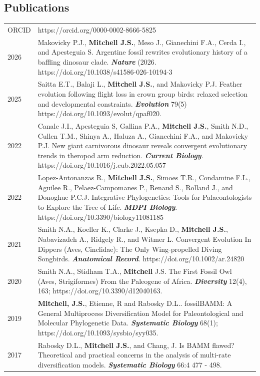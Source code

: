 \documentclass[a4paper, oneside, final]{scrartcl} %
\newcommand{\gray}{\rowcolor[gray]{.90}} %
\begin{document}
\begin{center}
\section{Publications}
\begin{tabularx}{0.97\linewidth}{>{\raggedleft\scshape}p{2cm}X}
 ORCID & https://orcid.org/0000-0002-8666-5825 \\
\gray 2026 & Makovicky P.J., \textbf{Mitchell J.S.}, Meso J., Gianechini F.A., Cerda I., and Apesteguia S. Argentine fossil rewrites evolutionary history of a baffling dinosaur clade. \textbf{\textit{Nature}} (2026. https://doi.org/10.1038/s41586-026-10194-3 \\
 2025 & Saitta E.T., Balaji L., \textbf{Mitchell J.S.}, and Makovicky P.J. Feather evolution following flight loss in crown group birds: relaxed selection and developmental constraints. \textbf{\textit{Evolution}} 79(5) https://doi.org/10.1093/evolut/qpaf020.\\
\gray 2022 & Canale J.I., Apesteguia S, Gallina P.A., \textbf{Mitchell J.S.}, Smith N.D., Cullen T.M., Shinya A., Haluza A., Gianechini F.A., and Makovicky P.J. New giant carnivorous dinosaur reveals convergent evolutionary trends in theropod arm reduction. \textbf{\textit{Current Biology}}. https://doi.org/10.1016/j.cub.2022.05.057 \\
2022 & Lopez-Antonanzas R., \textbf{Mitchell J.S.}, Simoes T.R., Condamine F.L., Aguilee R., Pelaez-Campomanes P., Renaud S., Rolland J., and Donoghue P.C.J. Integrative Phylogenetics: Tools for Palaeontologists to Explore the Tree of Life. \textbf{\textit{MDPI Biology}}. https://doi.org/10.3390/biology11081185 \\
\gray 2021 & Smith N.A., Koeller K., Clarke J., Ksepka D., \textbf{Mitchell J.S.}, Nabavizadeh A., Ridgely R., and Witmer L. Convergent Evolution In Dippers (Aves, Cinclidae): The Only Wing-propelled Diving Songbirds. \textbf{\textit{Anatomical Record}}. https://doi.org/10.1002/ar.24820 \\
2020 & Smith N.A., Stidham T.A., \textbf{Mitchell} J.S. The First Fossil Owl (Aves, Strigiformes) From the Paleogene of Africa. \textbf{\textit{Diversity}} 12(4), 163; https://doi.org/10.3390/d12040163. \\
\gray 2019 & \textbf{Mitchell, J.S.}, Etienne, R and Rabosky D.L.. fossilBAMM: A General Multiprocess Diversification Model for Paleontological and Molecular Phylogenetic Data. \textbf{\textit{Systematic Biology}} 68(1); https://doi.org/10.1093/sysbio/syy035.\\
2017 & Rabosky D.L., \textbf{Mitchell J.S.}, and Chang, J. Is BAMM flawed? Theoretical and practical concerns in the analysis of multi-rate diversification models. \textbf{\textit{Systematic Biology}} 66:4 477 - 498. \\

\end{tabularx}
\end{center}
\end{document}
